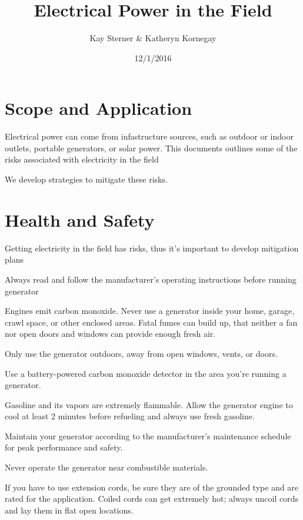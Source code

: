 \documentclass[12pt]{../SOP3_beta}
\title{Electrical Power in the Field}
\date{12/1/2016}
\author{Kay Sterner \& Katheryn Kornegay}
\begin{document}


\maketitle

\section{Scope and Application}

\NP Electrical power can come from infastructure sources, such as outdoor or indoor outlets, portable generators, or solar power.
\NP This documents outlines some of the risks associated with electricity in the field

\NP We develop strategies to mitigate these risks.

\section{Health and Safety}

\NP Getting electricity in the field has risks, thus it's important to develop mitigation plans

\NP Always read and follow the manufacturer's operating instructions before running
generator

\NP Engines emit carbon monoxide. Never use a generator inside your home, garage, crawl space, or other enclosed areas. Fatal fumes can build up, that neither a fan nor open doors and windows can provide enough fresh air.

\NP Only use the generator outdoors, away from open windows, vents, or doors.

\NP Use a battery-powered carbon monoxide detector in the area you're running a generator.

\NP Gasoline and its vapors are extremely flammable. Allow the generator engine to cool at least 2 minutes before refueling and always use fresh gasoline. 

\NP Maintain your generator according to the manufacturer’s maintenance schedule for peak performance and safety.

\NP Never operate the generator near combustible materials.

\NP If you have to use extension cords, be sure they are of the grounded type and are rated for the application. Coiled cords can get extremely hot; always uncoil cords and lay them in flat open locations.
\end{document}
